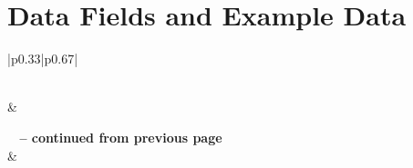\chapter{Data Fields and Example Data}

\begin{longtable}{|p{}|p{}|}
	\toprule\noalign{}
	\caption{Fields of Projects}
	\label{tab:appendix-fields-meaning}                                                                      \\

	\hline
	 &                              \\
	\hline
	\endfirsthead

	{{\bfseries \tablename\ \thetable{} -- continued from previous page}}                                    \\
	\hline
	 &                              \\
	\hline
	\endhead

	\hline
	                                                           \\ \hline
	\endfoot

	\hline \hline
	\endlastfoot


\end{longtable}
